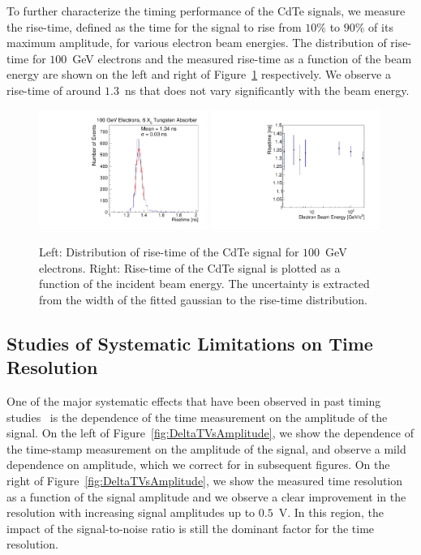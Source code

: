 To further characterize the timing performance of the CdTe signals, we measure the
rise-time, defined as the time for the signal to rise from $10\%$ to $90\%$ of its maximum
amplitude, for various electron beam energies. The distribution of rise-time for
$100$~GeV electrons and the measured rise-time as a function of the beam energy
are shown on the left and right of Figure~\ref{fig:riseTime} respectively. 
We observe a rise-time of around $1.3$~ns that does not vary significantly
with the beam energy.


\begin{figure}[htbp] 
\centering
\includegraphics[width=0.49\textwidth]{figures/100GeV_risetime.pdf} 
\includegraphics[width=0.49\textwidth]{figures/RisetimeVsEnergy.pdf} 
\caption{ Left: Distribution of rise-time of the CdTe signal for $100$~GeV electrons. 
Right: Rise-time of the CdTe signal is plotted as a function of the incident beam energy. 
The uncertainty is extracted from the width of the fitted gaussian to the rise-time 
distribution. 
} 
\label{fig:riseTime} 
\end{figure} 



\subsection{Studies of Systematic Limitations on Time Resolution}
\label{sec:systematicLimitations}

One of the major systematic effects that have been observed in past
timing studies~\cite{Anderson:2015gha,Ronzhin201552,MCPShowerMaxPaper} is the dependence 
of the time measurement on the amplitude of the signal. On the left of 
Figure~\ref{fig:DeltaTVsAmplitude}, we show the dependence of the time-stamp measurement 
on the amplitude of the signal, and observe a mild dependence on amplitude, which we correct for
in subsequent figures.
On the right of Figure~\ref{fig:DeltaTVsAmplitude}, we show the measured time resolution
as a function of the signal amplitude and we observe a clear improvement
in the resolution with increasing signal amplitudes up to $0.5$~V.
In this region, the impact of the signal-to-noise ratio is still 
the dominant factor for the time resolution.

